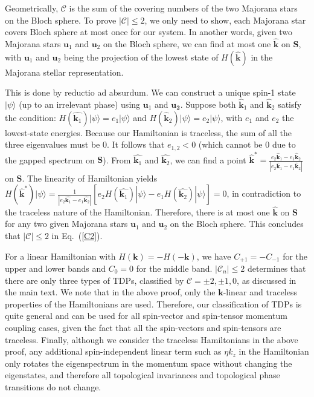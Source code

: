 \documentclass[aps,prl,floatfix,twocolumn,reprint]{revtex4}
\begin{document}
Geometrically, $\mathcal{C}$ is the sum of the covering numbers of the two
Majorana stars on the Bloch sphere. To prove $|\mathcal{C}|\leq 2$, we only
need to show, each Majorana star covers Bloch sphere at most once for our
system. In another words, given two Majorana stars $\bm{u}_{1}$ and $\bm{u}%
_{2}$ on the Bloch sphere, we can find at most one $\hat{\bm{k}}$ on $\bm{S}$,
with $\bm{u}_{1}$ and $\bm{u}_{2}$ being the projection of the lowest state of $%
H(\hat{\bm{k}})$ in the Majorana stellar representation.

This is done by reductio ad absurdum. We can construct a unique spin-1 state
$|\psi \rangle $ (up to an irrelevant phase) using $\bm{u}_{1}$ and $\bm{u_2}$. 
Suppose both $\hat{\bm{k}}_{1}$ and $\hat{\bm{k}}_{2}$ satisfy the
condition: $H(\hat{\bm{k}_{1}})|\psi \rangle =e_{1}|\psi \rangle $ and $H(\hat{\bm{k}}%
_{2})|\psi \rangle =e_{2}|\psi \rangle $, with $e_{1}$ and $e_{2}$ the lowest-state energies. 
Because our Hamiltonian is traceless, the sum of
all the three eigenvalues must be $0$. It follows that $e_{1,2}<0$ (which cannot be $0$ due
to the gapped spectrum on $\bm{S}$). From $\hat{\bm{k}_1}$ and $\hat{\bm{k}_2}$, 
we can find a point $\hat{\bm{k}}^*=\frac{e_{2}\hat{\bm{k}}_{1}-e_{1}\hat{\bm{k}}_{2}}{|e_{2}\hat{\bm{k}}_{1}-e_{1}\hat{\bm{k}}_{2}|}$ on $\bm{S}$. The linearity of Hamiltonian yields $%
H(\hat{\bm{k}}^*)|\psi \rangle =\frac{1}{|e_{2}\hat{\bm{k}_{1}}-e_{1}\hat{\bm{k}_{2}}|}[e_{2}H(\hat{\bm{k}_{1}})|\psi
\rangle -e_{1}H(\hat{\bm{k}_{2}})|\psi \rangle] =0$, in contradiction to the
traceless nature of the Hamiltonian. Therefore, there is at most 
one $\hat{\bm{k}}$ on $\bm{S}$ for any two given Majorana stars $\bm{u}_{1}$ and $\bm{u}_{2}$ 
on the Bloch sphere. This concludes that $|\mathcal{C}|\leq 2$ in Eq.~(\ref{C2}).


For a linear Hamiltonian with $H(\mathbf{k})=-H(-\mathbf{k})$, we have $%
C_{+1}=-C_{-1}$ for the upper and lower bands and $C_{0}=0$ for the middle
band. $\left\vert \mathcal{C}_{n}\right\vert \leq 2$ determines that there
are only three types of TDPs, classified by $\mathcal{C}=\pm 2,\pm 1,0$, as
discussed in the main text. We note that in the above proof, only the $\bm k$-linear
and traceless properties of the Hamiltonians are used. Therefore, our classification
of TDPs is quite general and can be used for all spin-vector and spin-tensor
momentum coupling cases, given the fact that all the spin-vectors and spin-tensors are traceless. 
Finally, although we consider the traceless
Hamiltonians in the above proof, any additional spin-independent linear term
such as $\eta k_{z}$ in the Hamiltonian only rotates the eigenspectrum in the
momentum space without changing the eigenstates, and therefore all topological
invariances and topological phase transitions do not change.
\end{document}
